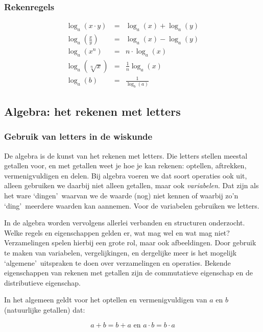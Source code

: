 \subsubsection{Rekenregels}

\begin{ftrekenregel}
	\begin{eqnarray*}
		\log_{a}(x \cdot y) &=& \log_{a}(x) + \log_{a}(y) \\
		\log_{a}(\frac{x}{y}) &=& \log_{a}(x) - \log_{a}(y) \\
		\log_{a}(x^n) &=& n \cdot \log_{a}(x) \\
		\log_{a}(\sqrt[n]{x}) &=& \frac{1}{n}\log_{a}(x) \\
		\log_{a}(b) &=& \frac{1}{\log_{b}(a)} 
	\end{eqnarray*}
\end{ftrekenregel}


\subsection{Algebra: het rekenen met letters}


\subsubsection{Gebruik van letters in de wiskunde}

De algebra is de kunst van het rekenen met letters. Die letters stellen
meestal getallen voor, en met getallen weet je hoe je kan rekenen:
optellen, aftrekken, vermenigvuldigen en delen. Bij algebra voeren
we dat soort operaties ook uit, alleen gebruiken we daarbij niet alleen
getallen, maar ook \emph{variabelen}. Dat zijn als het ware \textquoteleft dingen\textquoteright \
waarvan we de waarde (nog) niet kennen of waarbij zo'n \textquoteleft ding\textquoteright \  meerdere
waarden kan aannemen. Voor de variabelen gebruiken we letters.

In de algebra worden vervolgens allerlei verbanden en structuren
onderzocht. Welke regels en eigenschappen gelden er, wat mag wel en
wat mag niet? Verzamelingen spelen hierbij een grote rol, maar ook
afbeeldingen. Door gebruik te maken van variabelen, vergelijkingen,
en dergelijke meer is het mogelijk \textquoteleft algemene\textquoteright \  uitspraken te doen over
verzamelingen en operaties. Bekende eigenschappen van rekenen met
getallen zijn de commutatieve eigenschap en de distributieve eigenschap.

\begin{voorbeeld}
	In het algemeen geldt voor het optellen en vermenigvuldigen
van $a$ en $b$ (natuurlijke getallen) dat:

\begin{equation*}
a + b = b + a \text{ en } a \cdot b = b \cdot a
\end{equation*}

\end{voorbeeld}

